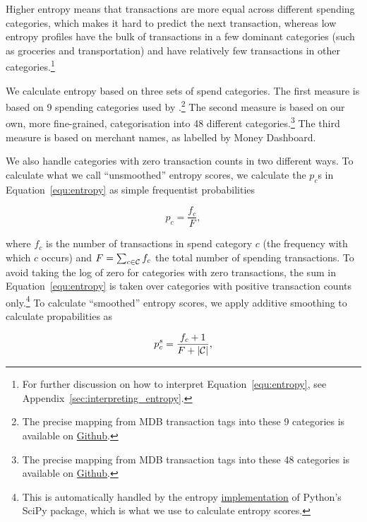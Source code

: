 Higher entropy means that transactions are more equal across different spending
categories, which makes it hard to predict the next transaction, whereas low
entropy profiles have the bulk of transactions in a few dominant categories
(such as groceries and transportation) and have relatively few transactions in
other categories.\footnote{For further discussion on how to interpret
Equation~\ref{equ:entropy}, see Appendix~\ref{sec:interpreting_entropy}.}

We calculate entropy based on three sets of spend categories. The first measure
is based on 9 spending categories used by
\citet{muggleton2020evidence}.\footnote{The precise mapping from MDB
    transaction tags into these 9 categories is available on
\href{https://github.com/fabiangunzinger/entropy/blob/7fa9c565bf8959ea92a9d4fe2245da0864e19c27/src/data/txn_classifications.py\#L249}{Github}.}
The second measure is based on our own, more fine-grained, categorisation into
48 different categories.\footnote{The precise mapping from MDB transaction tags
into these 48 categories is available on
\href{https://github.com/fabiangunzinger/entropy/blob/7fa9c565bf8959ea92a9d4fe2245da0864e19c27/src/data/txn_classifications.py\#L503}{Github}.}
The third measure is based on merchant names, as labelled by Money Dashboard.

We also handle categories with zero transaction counts in two different ways.
To calculate what we call ``unsmoothed'' entropy scores, we calculate the
$p_c$s in Equation~\ref{equ:entropy} as simple frequentist probabilities

\begin{equation}
    p_c = \frac{f_c}{F},
\end{equation}

\noindent where $f_c$ is the number of transactions in spend category $c$ (the
frequency with which $c$ occurs) and $F = \sum_{c \in \mathcal{C}}f_c$ the total
number of spending transactions. To avoid taking the log of zero for categories
with zero transactions, the sum in Equation~\ref{equ:entropy} is taken over
categories with positive transaction counts only.\footnote{This is
    automatically handled by the entropy
    \href{https://docs.scipy.org/doc/scipy/reference/generated/scipy.stats.entropy.html}{implementation}
of Python's SciPy package, which is what we use to calculate entropy scores.}
To calculate ``smoothed'' entropy scores, we apply additive smoothing to
calculate propabilities as

\begin{equation}
    p_c^{s} = \frac{f_c + 1}{F + |\mathcal{C}|},
\end{equation}

